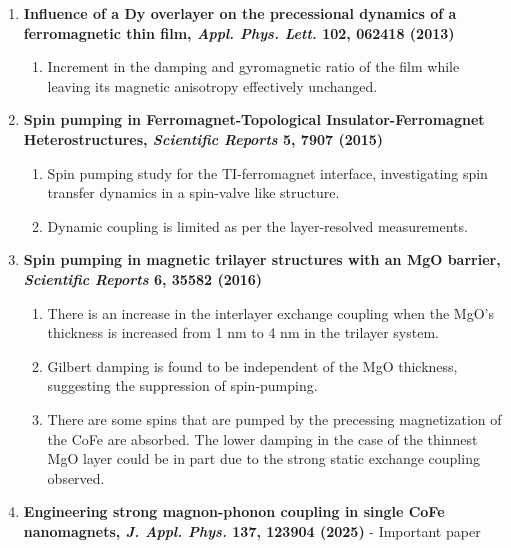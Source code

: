 \begin{enumerate}
\begin{enumerate}[(1.)]
\begin{enumerate}[\ding{217}]
            \item Increment in the damping and gyromagnetic ratio of the film while leaving its magnetic anisotropy effectively unchanged.
        \end{enumerate}
        \item \textbf{Influence of a Dy overlayer on the precessional dynamics of a ferromagnetic thin film, \textit{Appl. Phys. Lett. } 102, 062418 (2013)}
        \begin{enumerate}[\ding{217}]
            \item Increment in the damping and gyromagnetic ratio of the film while leaving its magnetic anisotropy effectively unchanged.
        \end{enumerate}
        \item \textbf{Spin pumping in Ferromagnet-Topological Insulator-Ferromagnet Heterostructures, \textit{Scientific Reports} 5, 7907 (2015)}
        \begin{enumerate}[\ding{217}]
            \item Spin pumping study for the TI-ferromagnet interface, investigating spin transfer dynamics in a spin-valve like structure.
            \item Dynamic coupling is limited as per the layer-resolved measurements.
        \end{enumerate}
        \item \textbf{Spin pumping in magnetic trilayer structures with an MgO barrier, \textit{Scientific Reports} 6, 35582 (2016)}
        \begin{enumerate}[\ding{217}]
            \item There is an increase in the interlayer exchange coupling when the MgO's thickness is increased from 1 nm to 4 nm in the trilayer system.
            \item Gilbert damping is found to be independent of the MgO thickness, suggesting the suppression of spin-pumping.
            \item There are some spins that are pumped by the precessing magnetization of the CoFe are absorbed. The lower damping in the case of the thinnest MgO layer could be in part due to the strong static exchange coupling observed.
        \end{enumerate}
        \item \textbf{Engineering strong magnon-phonon coupling in single CoFe nanomagnets, \textit{J. Appl. Phys.} 137, 123904 (2025)} - Important paper
        \begin{enumerate}[\ding{217}]

\end{enumerate}
\end{enumerate}
\end{enumerate}

